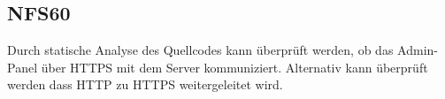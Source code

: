 \subsection*{NFS60}
Durch \gls{statische Analyse} des \Gls{Quellcode}s kann überprüft werden, ob das \Gls{Admin-Panel} über \Gls{HTTPS} mit dem \Gls{Server} kommuniziert.
Alternativ kann überprüft werden dass \Gls{HTTP} zu \Gls{HTTPS} weitergeleitet wird.